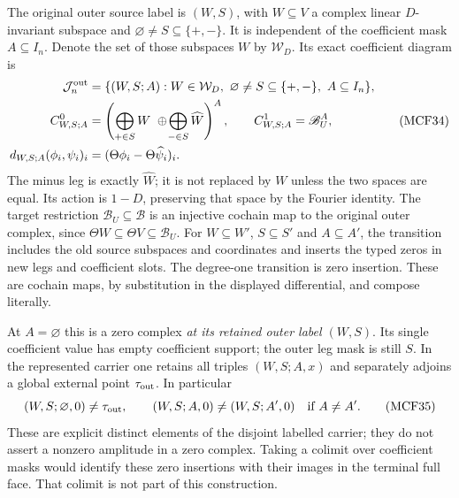 The original outer source label is $(W,S)$, with $W\subseteq V$ a
complex linear $D$-invariant subspace and
$\varnothing\ne S\subseteq\{+,-\}$.  It is independent
of the coefficient mask $A\subseteq I_n$.  Denote the set of those subspaces
$W$ by $\mathcal W_D$.  Its exact coefficient diagram is
\[
\begin{split}
\mathcal J_n^{\rm out}&=\{(W,S;A): W\in\mathcal W_D,
       \ \varnothing\ne S\subseteq\{+,-\},\ A\subseteq I_n\},\\
C_{W,S;A}^0&=
 \left(\bigoplus_{+\in S}W\ \oplus\!
                          \bigoplus_{-\in S}\widehat W\right)^A,
\qquad C_{W,S;A}^1=\mathscr B_U^A,\\
d_{W,S;A}(\phi_i,\psi_i)_i
      &=(\Theta\phi_i-\Theta\widehat\psi_i)_i.
\end{split}
\tag{MCF34}
\]
The minus leg is exactly $\widehat W$; it is not replaced by $W$ unless
the two spaces are equal.  Its action is $1-D$, preserving that space
by the Fourier identity.  The target restriction $\mathscr B_U\subseteq
\mathscr B$ is an injective cochain map to the original outer complex,
since $\Theta W\subseteq\Theta V\subseteq\mathscr B_U$.
For $W\subseteq W'$, $S\subseteq S'$ and $A\subseteq A'$, the
transition includes the old source subspaces and coordinates and inserts
the typed zeros in new legs and coefficient slots.  The degree-one
transition is zero insertion.  These are cochain maps, by substitution
in the displayed differential, and compose literally.

At $A=\varnothing$ this is a zero complex \emph{at its retained outer
label $(W,S)$}.  Its single coefficient value has empty coefficient
support; the outer leg mask is still $S$.  In the represented carrier
one retains all triples $(W,S;A,x)$ and separately adjoins a global
external point $\tau_{\rm out}$.  In particular
\[
(W,S;\varnothing,0)\ne\tau_{\rm out},\qquad
(W,S;A,0)\ne(W,S;A',0)\quad\text{if }A\ne A'.
\tag{MCF35}
\]
These are explicit distinct elements of the disjoint labelled carrier;
they do not assert a nonzero amplitude in a zero complex.  Taking a
colimit over coefficient masks would identify these zero insertions
with their images in the terminal full face.  That colimit is not part
of this construction.

